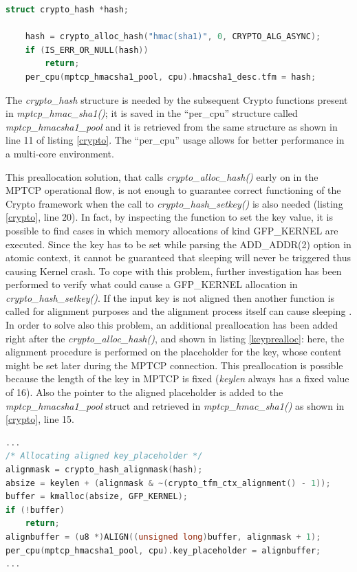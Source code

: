 \begin{lstlisting}[language=c, caption=Initializing the Crypto-API framework, label=cryptoalloc]
	struct crypto_hash *hash;

	hash = crypto_alloc_hash("hmac(sha1)", 0, CRYPTO_ALG_ASYNC);
	if (IS_ERR_OR_NULL(hash))
		return;
	per_cpu(mptcp_hmacsha1_pool, cpu).hmacsha1_desc.tfm = hash;
\end{lstlisting}

The \textit{crypto\_hash} structure is needed by the subsequent Crypto functions present in \textit{mptcp\_hmac\_sha1()}; it is saved in the ``per\_cpu'' structure called \textit{mptcp\_hmacsha1\_pool} and it is retrieved from the same structure as shown in line 11 of listing \ref{crypto}. The ``per\_cpu'' usage allows for better performance in a multi-core environment.

This preallocation solution, that calls \textit{crypto\_alloc\_hash()} early on in the MPTCP operational flow, is not enough to guarantee correct functioning of the Crypto framework when the call to \textit{crypto\_hash\_setkey()} is also needed (listing \ref{crypto}, line 20). In fact, by inspecting the function to set the key value, it is possible to find cases in which memory allocations of kind GFP\_KERNEL are executed. Since the key has to be set while parsing the ADD\_ADDR(2) option in atomic context, it cannot be guaranteed that sleeping will never be triggered thus causing Kernel crash. To cope with this problem, further investigation has been performed to verify what could cause a GFP\_KERNEL allocation in \textit{crypto\_hash\_setkey()}. If the input key is not aligned then another function \cite{shash61} is called for alignment purposes and the alignment process itself can cause sleeping \cite{shash43}. In order to solve also this problem, an additional preallocation has been added right after the  \textit{crypto\_alloc\_hash()}, and shown in listing \ref{keyprealloc}: here, the alignment procedure is performed on the placeholder for the key, whose content might be set later during the MPTCP connection. This preallocation is possible because the length of the key in MPTCP is fixed (\textit{keylen} always has a fixed value of 16).
Also the pointer to the aligned placeholder is added to the \textit{mptcp\_hmacsha1\_pool} struct and retrieved in \textit{mptcp\_hmac\_sha1()} as shown in \ref{crypto}, line 15.

\begin{lstlisting}[language=c, caption=Preallocating an aligned placeholder for the HMAC key, label=keyprealloc]
...
/* Allocating aligned key_placeholder */
alignmask = crypto_hash_alignmask(hash);
absize = keylen + (alignmask & ~(crypto_tfm_ctx_alignment() - 1));
buffer = kmalloc(absize, GFP_KERNEL);
if (!buffer)
	return;
alignbuffer = (u8 *)ALIGN((unsigned long)buffer, alignmask + 1);
per_cpu(mptcp_hmacsha1_pool, cpu).key_placeholder = alignbuffer;
...
\end{lstlisting}

